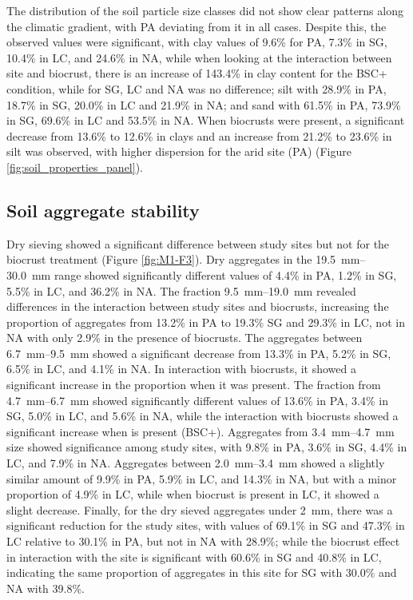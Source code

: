The distribution of the soil particle size classes did not show clear patterns along the climatic gradient, with PA deviating from it in all cases. Despite this, the observed values were significant, with clay values of 9.6\% for PA, 7.3\% in SG, 10.4\% in LC, and 24.6\% in NA, while when looking at the interaction between site and biocrust, there is an increase of 143.4\% in clay content for the BSC+ condition, while for SG, LC and NA was no difference; silt with 28.9\% in PA, 18.7\% in SG, 20.0\% in LC and 21.9\% in NA; and sand with 61.5\% in PA, 73.9\% in SG, 69.6\% in LC and 53.5\% in NA. When biocrusts were present, a significant decrease from 13.6\% to 12.6\% in clays and an increase from 21.2\% to 23.6\% in silt was observed, with higher dispersion for the arid site (PA) (Figure \ref{fig:soil_properties_panel}).

\subsection{Soil aggregate stability}

Dry sieving showed a significant difference between study sites but not for the biocrust treatment (Figure \ref{fig:M1-F3}). Dry aggregates in the \SIrange[range-phrase=--,range-units=single]{19.5}{30.0}{\milli\meter} range showed significantly different values of 4.4\% in PA, 1.2\% in SG, 5.5\% in LC, and 36.2\% in NA. The fraction \SIrange[range-phrase=--,range-units=single]{9.5}{19.0}{\milli\meter} revealed differences in the interaction between study sites and biocrusts, increasing the proportion of aggregates from 13.2\% in PA to 19.3\% SG and 29.3\% in LC, not in NA with only 2.9\% in the presence of biocrusts. The aggregates between \SIrange[range-phrase=--,range-units=single]{6.7}{9.5}{\milli\meter} showed a significant decrease from 13.3\% in PA, 5.2\% in SG, 6.5\% in LC, and 4.1\% in NA. In interaction with biocrusts, it showed a significant increase in the proportion when it was present. The fraction from \SIrange[range-phrase=--,range-units=single]{4.7}{6.7}{\milli\meter} showed significantly different values of 13.6\% in PA, 3.4\% in SG, 5.0\% in LC, and 5.6\% in NA, while the interaction with biocrusts showed a significant increase when is present (BSC+). Aggregates from \SIrange[range-phrase=--,range-units=single]{3.4}{4.7}{\milli\meter} size showed significance among study sites, with 9.8\% in PA, 3.6\% in SG, 4.4\% in LC, and 7.9\% in NA. Aggregates between \SIrange[range-phrase=--,range-units=single]{2.0}{3.4}{\milli\meter} showed a slightly similar amount of 9.9\% in PA, 5.9\% in LC, and 14.3\% in NA, but with a minor proportion of 4.9\% in LC, while when biocrust is present in LC, it showed a slight decrease. Finally, for the dry sieved aggregates under \SI{2}{\milli\meter}, there was a significant reduction for the study sites, with values of 69.1\% in SG and 47.3\% in LC relative to 30.1\% in PA, but not in NA with 28.9\%; while the biocrust effect in interaction with the site is significant with 60.6\% in SG and 40.8\% in LC, indicating the same proportion of aggregates in this site for SG with 30.0\% and NA with 39.8\%.

